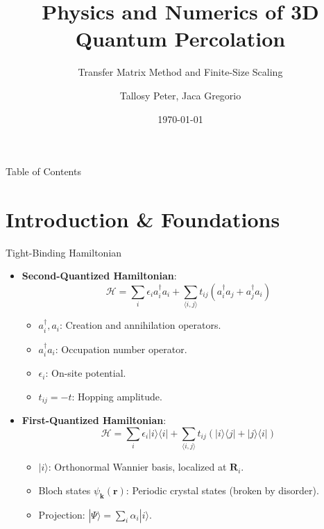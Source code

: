 \documentclass[10pt,aspectratio=169]{beamer}
\title[3D Quantum Percolation]{Physics and Numerics of 3D Quantum Percolation}
\subtitle{Transfer Matrix Method and Finite-Size Scaling}
\author[Tallosy \& Jaca]{Tallosy Peter, Jaca Gregorio}
\date[\today]{\today}
\begin{document}
\begin{frame}
  \titlepage
\end{frame}

\begin{frame}{Table of Contents}
  \tableofcontents
\end{frame}

\section{Introduction \& Foundations}

\begin{frame}{Tight-Binding Hamiltonian}
  \begin{itemize}
    \item \textbf{Second-Quantized Hamiltonian}:
      \begin{equation}
      \mathcal{H} = \sum_{i} \epsilon_i a_i^\dagger a_i + \sum_{\langle i,j \rangle} t_{ij} \left( a_i^\dagger a_j + a_j^\dagger a_i \right)
      \end{equation}
      \begin{itemize}
        \item $a_i^\dagger, a_i$: Creation and annihilation operators.
        \item $a_i^\dagger a_i$: Occupation number operator.
        \item $\epsilon_i$: On-site potential.
        \item $t_{ij} = -t$: Hopping amplitude.
      \end{itemize}
    \vspace{0.2cm}
    \item \textbf{First-Quantized Hamiltonian}:
      \begin{equation}
      \mathcal{H} = \sum_{i} \epsilon_i |i\rangle\langle i| + \sum_{\langle i,j \rangle} t_{ij} \left( |i\rangle\langle j| + |j\rangle\langle i| \right)
      \end{equation}
      \begin{itemize}
        \item $|i\rangle$: Orthonormal Wannier basis, localized at $\mathbf{R}_i$.
        \item Bloch states $\psi_{\mathbf{k}}(\mathbf{r})$: Periodic crystal states (broken by disorder).
        \item Projection: $|\Psi\rangle = \sum_i \alpha_i |i\rangle$.
      \end{itemize}
  \end{itemize}
\end{frame}
\end{document}
